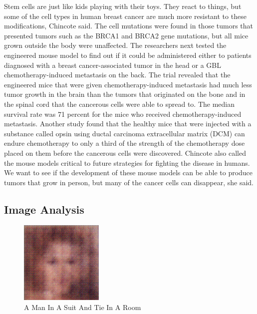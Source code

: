 \documentclass{article}%
\begin{document}
Stem cells are just like kids playing with their toys. They react to things, but some of the cell types in human breast cancer are much more resistant to these modifications, Chincote said.\newline%
The cell mutations were found in those tumors that presented tumors such as the BRCA1 and BRCA2 gene mutations, but all mice grown outside the body were unaffected.\newline%
The researchers next tested the engineered mouse model to find out if it could be administered either to patients diagnosed with a breast cancer{-}associated tumor in the head or a GBL chemotherapy{-}induced metastasis on the back.\newline%
The trial revealed that the engineered mice that were given chemotherapy{-}induced metastasis had much less tumor growth in the brain than the tumors that originated on the bone and in the spinal cord that the cancerous cells were able to spread to.\newline%
The median survival rate was 71 percent for the mice who received chemotherapy{-}induced metastasis. Another study found that the healthy mice that were injected with a substance called opsin using ductal carcinoma extracellular matrix (DCM) can endure chemotherapy to only a third of the strength of the chemotherapy dose placed on them before the cancerous cells were discovered.\newline%
Chincote also called the mouse models critical to future strategies for fighting the disease in humans.\newline%
We want to see if the development of these mouse models can be able to produce tumors that grow in person, but many of the cancer cells can disappear, she said.

%
\subsection{Image Analysis}%
\label{subsec:ImageAnalysis}%


\begin{figure}[h!]%
\centering%
\includegraphics[width=150px]{500_fake_images/samples_5_294.png}%
\caption{A Man In A Suit And Tie In A Room}%
\end{figure}

%
\end{document}
